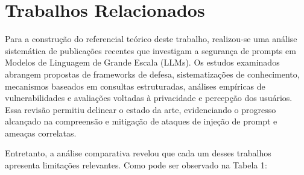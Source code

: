 \section{Trabalhos Relacionados}
\label{sec:related}

Para a construção do referencial teórico deste trabalho, realizou-se uma análise sistemática de publicações recentes que investigam a segurança de prompts em Modelos de Linguagem de Grande Escala (LLMs). Os estudos examinados abrangem propostas de frameworks de defesa, sistematizações de conhecimento, mecanismos baseados em consultas estruturadas, análises empíricas de vulnerabilidades e avaliações voltadas à privacidade e percepção dos usuários. Essa revisão permitiu delinear o estado da arte, evidenciando o progresso alcançado na compreensão e mitigação de ataques de injeção de prompt e ameaças correlatas.

Entretanto, a análise comparativa revelou que cada um desses trabalhos apresenta limitações relevantes. Como pode ser observado na Tabela 1:

\small
\setlength{\extrarowheight}{2pt}

